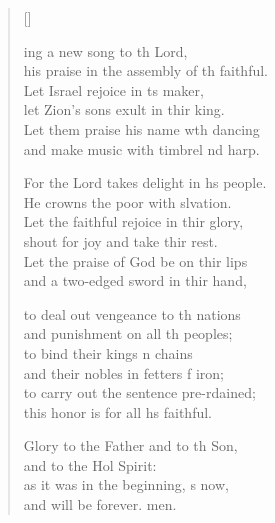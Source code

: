 \settowidth{\versewidth}{his praise in the assembly of the faithful.}
\begin{verse}[\versewidth]
  \begin{patverse}
    ing a new song to th Lord,\Med\\
his praise in the assembly of th faithful.\\
Let Israel rejoice in \pointup{\i}ts maker,\Med\\
let Zion’s sons exult in thir king.\\
Let them praise his name w\pointup{\i}th dancing\Med\\
and make music with timbrel nd harp.

For the Lord takes delight in h\pointup{\i}s people.\Med\\
He crowns the poor with slvation.\\
Let the faithful rejoice in thir glory,\Med\\
shout for joy and take thir rest.\\
Let the praise of God be on thir lips\Med\\
and a two-edged sword in thir hand,

to deal out vengeance to th nations\Med\\
and punishment on all th peoples;\\
to bind their kings \pointup{\i}n chains\Med\\
and their nobles in fetters f iron;\\
to carry out the sentence pre-rdained;\Med\\
this honor is for all h\pointup{\i}s faithful.

Glory to the Father and to th Son,\Med\\
and to the Hol Spirit:\\
as it was in the beginning, \pointup{\i}s now,\Med\\
and will be forever. men.
  \end{patverse}
\end{verse}
